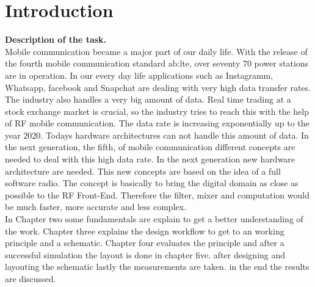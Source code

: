 \chapter{Introduction}
\textbf{Description of the task.}\\
Mobile communication became a major part of our daily life. With the release of the fourth mobile communication standard  \gls{ab:lte}, over seventy 70 power stations are in operation.
In our every day life applications such as Instagramm, Whatsapp, facebook  and Snapchat  are dealing with very high data transfer rates. The industry also handles a very big amount of data. 
Real time trading at a stock exchange market is crucial, so the industry tries to reach this with the help of RF mobile communication. 
The data rate is increasing exponentially up to the year 2020. 
Todays hardware architectures can not handle this amount of data. 
In the next generation, the fifth, of mobile communication different concepts are needed to deal with this high data rate. 
In the next generation new hardware architecture are needed. This new concepts are based on the idea of a full software radio. 
The concept is basically to bring the digital domain as close as possible to the RF Front-End. 
Therefore the filter, mixer and computation would be much faster, more accurate and less complex. \\
In Chapter two some fundamentals are explain to get a better understanding of the work. Chapter three explains the design workflow to get to an working principle and a schematic. Chapter four evaluates the principle and after a successful simulation the layout is done in chapter five. after designing and layouting the schematic lastly the measurements are taken. in the end the results are discussed.\\
